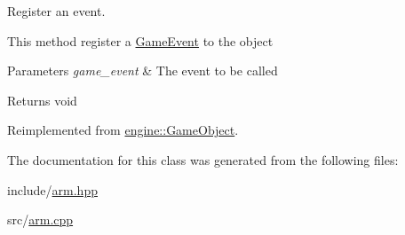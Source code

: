 Register an event. 

This method register a \hyperlink{class_game_event}{Game\+Event} to the object


\begin{DoxyParams}{Parameters}
{\em game\+\_\+event} & The event to be called\\
\hline
\end{DoxyParams}
\begin{DoxyReturn}{Returns}
void 
\end{DoxyReturn}


Reimplemented from \hyperlink{classengine_1_1_game_object}{engine\+::\+Game\+Object}.



The documentation for this class was generated from the following files\+:\begin{DoxyCompactItemize}
\item 
include/\hyperlink{arm_8hpp}{arm.\+hpp}\item 
src/\hyperlink{arm_8cpp}{arm.\+cpp}\end{DoxyCompactItemize}
